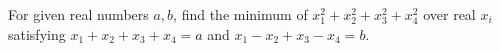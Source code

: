 For given real numbers $a,b$, find the minimum of $x_1^2+x_2^2+x_3^2+x_4^2$ over real $x_i$ satisfying $x_1+x_2+x_3+x_4=a$ and $x_1-x_2+x_3-x_4=b$.
